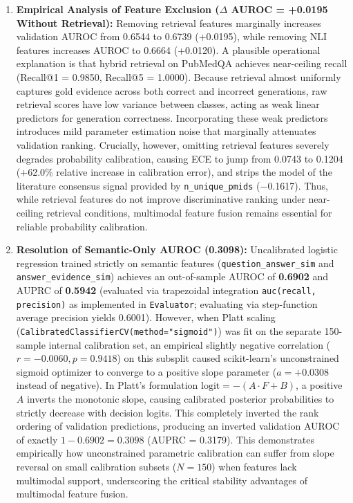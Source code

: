 \documentclass[journal,10pt]{IEEEtran}
\begin{document}
\begin{enumerate}
    \item \textbf{Empirical Analysis of Feature Exclusion ($\Delta$ AUROC = +0.0195 Without Retrieval):} Removing retrieval features marginally increases validation AUROC from 0.6544 to 0.6739 (+0.0195), while removing NLI features increases AUROC to 0.6664 (+0.0120). A plausible operational explanation is that hybrid retrieval on PubMedQA achieves near-ceiling recall (Recall@1 = 0.9850, Recall@5 = 1.0000). Because retrieval almost uniformly captures gold evidence across both correct and incorrect generations, raw retrieval scores have low variance between classes, acting as weak linear predictors for generation correctness. Incorporating these weak predictors introduces mild parameter estimation noise that marginally attenuates validation ranking. Crucially, however, omitting retrieval features severely degrades probability calibration, causing ECE to jump from 0.0743 to 0.1204 (+62.0\% relative increase in calibration error), and strips the model of the literature consensus signal provided by \texttt{n\_unique\_pmids} ($-$0.1617). Thus, while retrieval features do not improve discriminative ranking under near-ceiling retrieval conditions, multimodal feature fusion remains essential for reliable probability calibration.
    \item \textbf{Resolution of Semantic-Only AUROC (0.3098):} Uncalibrated logistic regression trained strictly on semantic features (\texttt{question\_answer\_sim} and \texttt{answer\_evidence\_sim}) achieves an out-of-sample AUROC of \textbf{0.6902} and AUPRC of \textbf{0.5942} (evaluated via trapezoidal integration \texttt{auc(recall, precision)} as implemented in \texttt{Evaluator}; evaluating via step-function average precision yields 0.6001). However, when Platt scaling (\texttt{CalibratedClassifierCV(method="sigmoid")}) was fit on the separate 150-sample internal calibration set, an empirical slightly negative correlation ($r = -0.0060, p = 0.9418$) on this subsplit caused scikit-learn's unconstrained sigmoid optimizer to converge to a positive slope parameter ($a = +0.0308$ instead of negative). In Platt's formulation $\text{logit} = -(A \cdot F + B)$, a positive $A$ inverts the monotonic slope, causing calibrated posterior probabilities to strictly decrease with decision logits. This completely inverted the rank ordering of validation predictions, producing an inverted validation AUROC of exactly $1 - 0.6902 = \mathbf{0.3098}$ (AUPRC = 0.3179). This demonstrates empirically how unconstrained parametric calibration can suffer from slope reversal on small calibration subsets ($N=150$) when features lack multimodal support, underscoring the critical stability advantages of multimodal feature fusion.
\end{enumerate}
\end{document}
